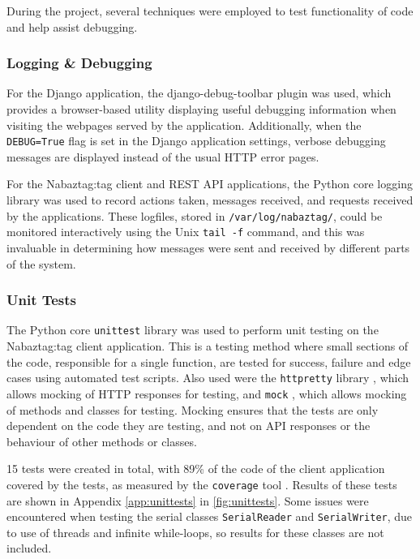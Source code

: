 \documentclass[12pt, a4paper]{article}
\begin{document}
	During the project, several techniques were employed to test functionality of code and help assist debugging.
	
	\subsubsection{Logging \& Debugging}
	
	For the Django application, the django-debug-toolbar plugin \parencite{djangodebug} was used, which provides a browser-based utility displaying useful debugging information when visiting the webpages served by the application. Additionally, when the \verb+DEBUG=True+ flag is set in the Django application settings, verbose debugging messages are displayed instead of the usual \ac{HTTP} error pages.
	
	For the Nabaztag:tag client and \ac{REST} \ac{API} applications, the Python core logging library was used to record actions taken, messages received, and requests received by the applications. These logfiles, stored in \verb+/var/log/nabaztag/+, could be monitored interactively using the Unix \verb+tail -f+ command, and this was invaluable in determining how messages were sent and received by different parts of the system.
	
	\subsubsection{Unit Tests}
	
	The Python core \verb+unittest+ library was used to perform unit testing on the Nabaztag:tag client application. This is a testing method where small sections of the code, responsible for a single function, are tested for success, failure and edge cases using automated test scripts. Also used were the \verb+httpretty+ library \parencite{httpretty}, which allows mocking of \ac{HTTP} responses for testing, and \verb+mock+ \parencite{mock}, which allows mocking of methods and classes for testing. Mocking ensures that the tests are only dependent on the code they are testing, and not on \ac{API} responses or the behaviour of other methods or classes.
	
	15 tests were created in total, with 89\% of the code of the client application covered by the tests, as measured by the \verb+coverage+ tool \parencite{coverage}. Results of these tests are shown in Appendix \ref{app:unittests} in \autoref{fig:unittests}. Some issues were encountered when testing the serial classes \verb+SerialReader+ and \verb+SerialWriter+, due to use of threads and infinite while-loops, so results for these classes are not included.
	
\end{document}
